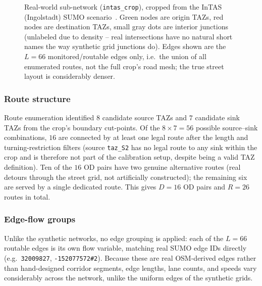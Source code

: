 \documentclass[11pt]{article}
\begin{document}
\begin{figure}[ht]
{\begin{tikzpicture}
\end{tikzpicture}%
}
\caption{Real-world sub-network (\texttt{intas\_crop}), cropped from the
InTAS (Ingolstadt) SUMO scenario~\parencite{lobo2020intas}. Green nodes are
origin TAZs, red nodes are destination TAZs, small gray dots are interior
junctions (unlabeled due to density -- real intersections have no natural
short names the way synthetic grid junctions do). Edges shown are the
$L=66$ monitored/routable edges only, i.e.\ the union of all enumerated
routes, not the full crop's road mesh; the true street layout is
considerably denser.}
\label{fig:network-intas-crop}
\end{figure}

\subsubsection*{Route structure}

Route enumeration identified $8$ candidate source TAZs and $7$ candidate
sink TAZs from the crop's boundary cut-points. Of the $8\times7=56$
possible source--sink combinations, $16$ are connected by at least one
legal route after the length and turning-restriction filters (source
\texttt{taz\_S2} has no legal route to any sink within the crop and is
therefore not part of the calibration setup, despite being a valid TAZ
definition). Ten of the $16$ OD pairs have two genuine alternative routes
(real detours through the street grid, not artificially constructed);
the remaining six are served by a single dedicated route. This gives
$D=16$ OD pairs and $R=26$ routes in total.

\subsubsection*{Edge-flow groups}

Unlike the synthetic networks, no edge grouping is applied: each of the
$L=66$ routable edges is its own flow variable, matching real SUMO edge
IDs directly (e.g.\ \texttt{32009827}, \texttt{-152077572\#2}). Because
these are real OSM-derived edges rather than hand-designed corridor
segments, edge lengths, lane counts, and speeds vary considerably across
the network, unlike the uniform edges of the synthetic grids.
\end{document}
